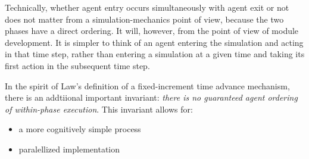 Technically, whether agent entry occurs simultaneously with agent exit or not
does not matter from a simulation-mechanics point of view, because the two
phases have a direct ordering. It will, however, from the point of view of
module development. It is simpler to think of an agent entering the simulation
and acting in that time step, rather than entering a simulation at a given time
and taking its first action in the subsequent time step.

In the spirit of Law's definition of a fixed-increment time advance mechanism,
there is an addtiional important invariant: \textit{there is no guaranteed agent
  ordering of within-phase execution}. This invariant allows for:

\begin{itemize}
\item a more cognitively simple process
\item paralellized implementation
\end{itemize}
